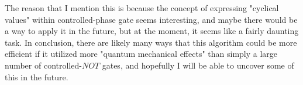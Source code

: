 \documentclass{article}
\begin{document}
\newline\newline
The reason that I mention this is because the concept of expressing "cyclical values" within controlled-phase gate seems interesting, and maybe there would be a way to apply it in the future, but at the moment, it seems like a fairly daunting task.
\newline\newline
In conclusion, there are likely many ways that this algorithm could be more efficient if it utilized more "quantum mechanical effects" than simply a large number of controlled-$NOT$ gates, and hopefully I will be able to uncover some of this in the future.
\end{document}
